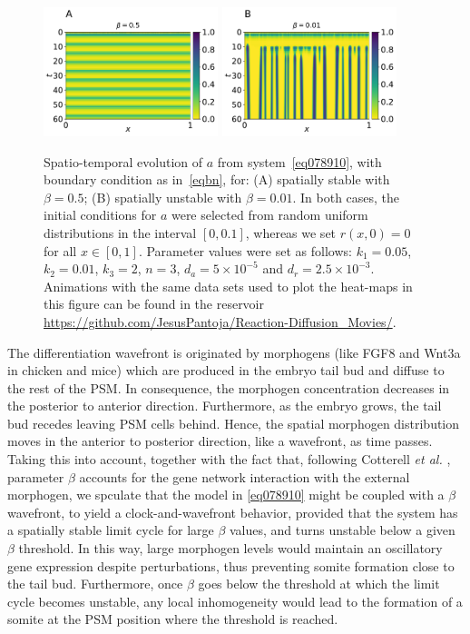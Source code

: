 \documentclass[%
 preprint,
 aip, 
 amsmath,amssymb,
]{revtex4-2}
\begin{document}
	\begin{figure}[t!]
		\centering
		\includegraphics[width=2in]{Fig03a.pdf}
		\includegraphics[width=2in]{Fig03b.pdf}
		\caption{Spatio-temporal evolution of $a$ from system~\eqref{eq078910}, with
			boundary condition as in~\eqref{eqbn}, for: (A) spatially stable with
			$\beta=0.5$; (B) spatially unstable with $\beta=0.01$. In both cases, the
			initial conditions for $a$ were selected from random uniform distributions in
			the interval $[0, 0.1]$, whereas we set $r(x, 0) = 0$ for all $x\in[0,1]$.
			Parameter values were set as follows: $k_1=0.05$, $k_2=0.01$, $k_3=2$, $n=3$, $d_a =
			5\times10^{-5}$ and $d_r=2.5\times10^{-3}$. Animations with the same 
			data sets used to plot the heat-maps in this figure can be found in the 
			reservoir \url{https://github.com/JesusPantoja/Reaction-Diffusion_Movies/}.}
		\label{Fig03}
	\end{figure}

The differentiation wavefront is originated by morphogens (like FGF8 and Wnt3a in chicken and mice) which are produced in the embryo tail bud and diffuse to the rest of the PSM. In consequence, the morphogen concentration decreases in the posterior to anterior direction. Furthermore, as the embryo grows, the tail bud recedes leaving PSM cells behind. Hence, the spatial morphogen distribution moves in the anterior to posterior direction, like a wavefront, as time passes. Taking this into account, together with the fact that, following Cotterell \emph{et al.} \citep{Cotterell2015}, parameter $\beta$ accounts for the gene network interaction with the external morphogen, we spculate that the model in \eqref{eq078910} might be coupled with a $\beta$ wavefront, to yield a clock-and-wavefront behavior, provided that the system has a spatially stable limit cycle for large $\beta$ values, and turns unstable below a given $\beta$ threshold. In this way, large morphogen levels would maintain an oscillatory gene expression despite perturbations, thus preventing somite formation close to the tail bud. Furthermore, once $\beta$ goes below the threshold at which the limit cycle becomes unstable, any local inhomogeneity would lead to the formation of a somite at the PSM position where the threshold is reached.
\end{document}
